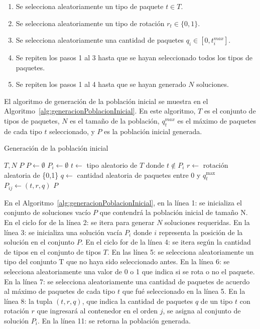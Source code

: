 \documentclass[openany]{article}
\begin{document}
\begin{enumerate}
    \item Se selecciona aleatoriamente un tipo de paquete $t \in T$.
    \item Se selecciona aleatoriamente un tipo de rotación $r_t \in \{0,1\}$.
    \item Se selecciona aleatoriamente una cantidad de paquetes $q_i \in [0, t_i^{max}]$.
    \item Se repiten los pasos 1 al 3 hasta que se hayan seleccionado todos los tipos de paquetes.
    \item Se repiten los pasos 1 al 4 hasta que se hayan generado $N$ soluciones.
\end{enumerate}

El algoritmo de generación de la población inicial se muestra en el Algoritmo~\ref{alg:generacionPoblacionInicial}. En este algoritmo, $T$ es el conjunto de tipos de paquetes, $N$ es el tamaño de la población, $q_t^{max}$ es el máximo de paquetes de cada tipo $t$ seleccionado, y $P$ es la población inicial generada.

\begin{algorithm}[H]
    \caption{Generación de la población inicial}\label{alg:generacionPoblacionInicial}
    \begin{algorithmic}[1]
        \Require $T, N$
        \Ensure $P$
        \State $P \leftarrow \emptyset$
        \State $P_i \leftarrow \emptyset$
        \State $t \leftarrow$ tipo aleatorio de $T$ donde $t \notin P_i$
        \State $r \leftarrow$ rotación aleatoria de \{0,1\}
        \State $q \leftarrow$ cantidad aleatoria de paquetes entre 0 y $q_t^{\max}$
        \State $P_{ij} \leftarrow (t, r, q)$
        \EndFor
        \EndFor
        \State \Return $P$
    \end{algorithmic}
\end{algorithm}

En el Algoritmo~\ref{alg:generacionPoblacionInicial}, en la línea 1: se inicializa el conjunto de soluciones vacío $P$ que contendrá la población inicial de tamaño N. En el ciclo for de la línea 2: se itera para generar $N$ soluciones requeridas. En la línea 3: se inicializa una solución vacía $P_i$  donde $i$ representa la posición de la solución en el conjunto $P$. En el ciclo for de la línea 4: se itera según la cantidad de tipos en el conjunto de tipos $T$. En las línea 5: se selecciona aleatoriamente un tipo del conjunto T que no haya sido seleccionado antes. En la línea 6: se selecciona aleatoriamente una valor de 0 o 1 que indica si se rota o no el paquete. En la línea 7: se selecciona aleatoriamente una cantidad de paquetes de acuerdo al máximo de paquetes de cada tipo $t$ que fué seleccionado en la línea 5. En la línea 8: la tupla $(t,r,q)$, que indica la cantidad de paquetes $q$ de un tipo $t$ con rotación $r$ que ingresará al contenedor en el orden $j$, se asigna al conjunto de solución $P_i$. En la línea 11: se retorna la población generada.
\end{document}
